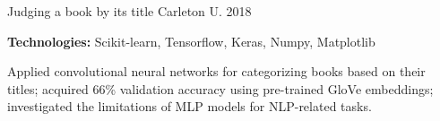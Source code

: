 \begin{cventries}
\cventry
{\textnormal{}}
{Judging a book by its title}
{Carleton U.}
{2018}
{\begin{cvitems}
    \item {\textbf{Technologies:} Scikit-learn, Tensorflow, Keras, Numpy, Matplotlib}
    \item {Applied convolutional neural networks for categorizing books based on their titles; acquired 66\% validation accuracy using pre-trained GloVe embeddings; investigated the limitations of MLP models for NLP-related tasks.}
\end{cvitems}}

\end{cventries}
